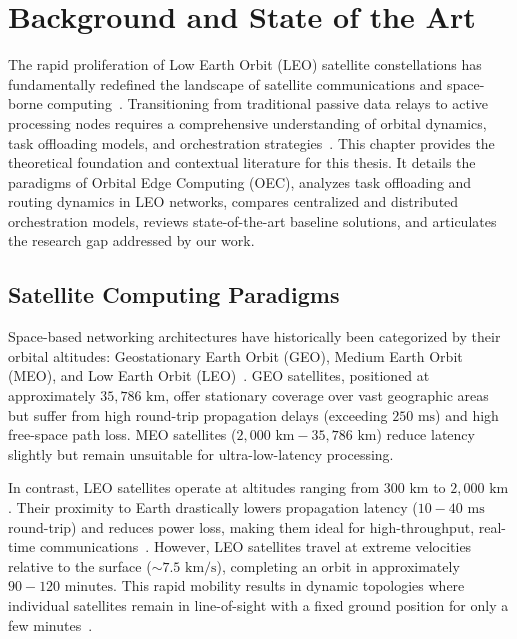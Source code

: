 \chapter{Background and State of the Art}
\label{chap:background}

The rapid proliferation of Low Earth Orbit (LEO) satellite constellations has fundamentally redefined the landscape of satellite communications and space-borne computing~\cite{survey_orbital_edge_2023}. Transitioning from traditional passive data relays to active processing nodes requires a comprehensive understanding of orbital dynamics, task offloading models, and orchestration strategies~\cite{denby2019orbital, denby2020asplos}. This chapter provides the theoretical foundation and contextual literature for this thesis. It details the paradigms of Orbital Edge Computing (OEC), analyzes task offloading and routing dynamics in LEO networks, compares centralized and distributed orchestration models, reviews state-of-the-art baseline solutions, and articulates the research gap addressed by our work.

\section{Satellite Computing Paradigms}
\label{sec:bg_paradigms}

Space-based networking architectures have historically been categorized by their orbital altitudes: Geostationary Earth Orbit (GEO), Medium Earth Orbit (MEO), and Low Earth Orbit (LEO)~\cite{survey_orbital_edge_2023}. GEO satellites, positioned at approximately $35,786 \text{ km}$, offer stationary coverage over vast geographic areas but suffer from high round-trip propagation delays (exceeding $250 \text{ ms}$) and high free-space path loss. MEO satellites ($2,000 \text{ km} - 35,786 \text{ km}$) reduce latency slightly but remain unsuitable for ultra-low-latency processing.

In contrast, LEO satellites operate at altitudes ranging from $300 \text{ km}$ to $2,000 \text{ km}$. Their proximity to Earth drastically lowers propagation latency ($10 - 40 \text{ ms}$ round-trip) and reduces power loss, making them ideal for high-throughput, real-time communications~\cite{chen2021isl, leyva2023satellite}. However, LEO satellites travel at extreme velocities relative to the surface ($\sim 7.5 \text{ km/s}$), completing an orbit in approximately $90 - 120 \text{ minutes}$. This rapid mobility results in dynamic topologies where individual satellites remain in line-of-sight with a fixed ground position for only a few minutes~\cite{tiansuan2023}.

